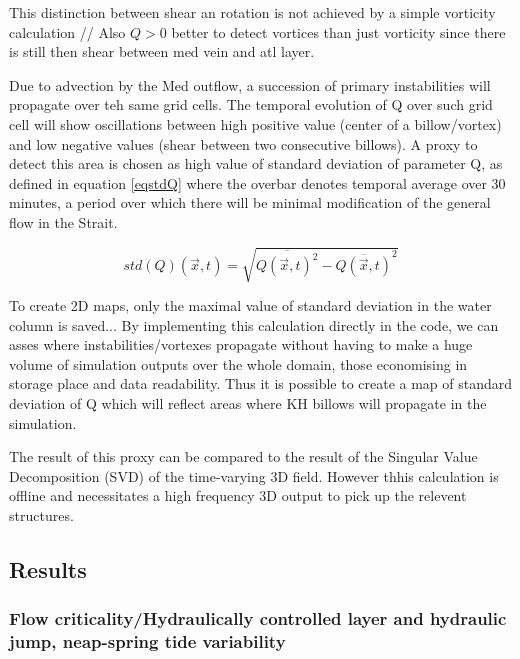 This distinction between shear an rotation is not achieved by a simple vorticity calculation // Also $Q>0$ better to detect vortices than just vorticity since there is still then shear between med vein and atl layer.


Due to advection by the Med outflow, a succession of primary instabilities will propagate over teh same grid cells. The temporal evolution of Q over such grid cell will show oscillations between high positive value (center of a billow/vortex) and low negative values (shear between two consecutive billows). A proxy to detect this area is chosen as high value of standard deviation of parameter Q, as defined in equation \ref{eqstdQ} where the overbar denotes temporal average over 30 minutes, a period over which there will be minimal modification of the general flow in the Strait.

\begin{equation} 
\label{eqstdQ} 
    std ( Q ) (\vec{x},t)=  \sqrt{   \overline{Q (\vec{x},t)^{2}} -  \overline{Q(\vec{x},t)}^{2}  }
\end{equation}

To create 2D maps, only the maximal value of standard deviation in the water column is saved...
By implementing this calculation directly in the code, we can asses where instabilities/vortexes propagate without having to make a huge volume of simulation outputs over the whole domain, those economising in storage place and data readability. Thus it is possible to create a map of standard deviation of Q which will reflect areas where KH billows will propagate in the simulation.

The result of this proxy can be compared to the result of the Singular Value Decomposition (SVD) of the time-varying 3D field. However thhis calculation is offline and necessitates a high frequency 3D output to pick up the relevent structures.



\subsection{Results}


\subsubsection{Flow criticality/Hydraulically controlled layer and hydraulic jump, neap-spring tide variability}

